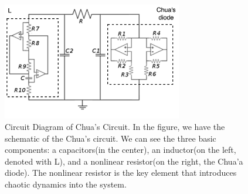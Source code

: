 \documentclass[12pt]{article}
\begin{document}
                \begin{figure}[h!]
                        \centering
                        \includegraphics[width=0.7\textwidth]{./img/other/circuit_img.png}
                        \caption{Circuit Diagram of Chua's Circuit. In the figure, we have the schematic of the Chua's circuit. We can see the three basic components: a capacitors(in the center), 
                        an inductor(on the left, denoted with L), and a nonlinear resistor(on the right, the Chua'a diode). The nonlinear resistor is the key element that introduces chaotic dynamics into the system.}
                        \label{fig: Circuit Diagram of Chua's Circuit.}
                \end{figure}
\end{document}
